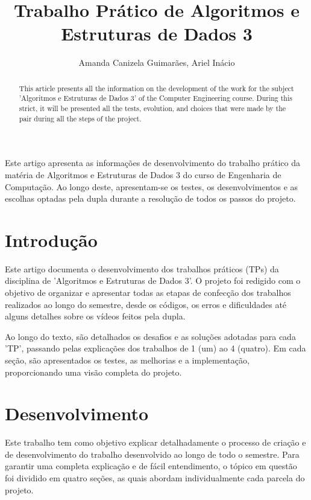 \documentclass[12pt]{article}
\title{Trabalho Prático de Algoritmos e Estruturas de Dados 3}
\author{Amanda Canizela Guimarães\inst{1}, Ariel Inácio\inst{2}
}
\begin{document}
 

\maketitle

\begin{abstract}
  This article presents all the information on the development of the work for the subject 'Algoritmos e Estruturas de Dados 3' of the Computer Engineering course. During this strict, it will be presented all the tests, evolution, and choices that were made by the pair during all the steps of the project.  
\end{abstract}
     
\begin{resumo} 
  Este artigo apresenta as informações de desenvolvimento do trabalho prático da matéria de Algoritmos e Estruturas de Dados 3 do curso de Engenharia de Computação. Ao longo deste, apresentam-se os testes, os desenvolvimentos e as escolhas optadas pela dupla durante a resolução de todos os passos do projeto.
\end{resumo}


\section{Introdução}

Este artigo documenta o desenvolvimento dos trabalhos práticos (TPs) da disciplina de 'Algoritmos e Estruturas de Dados 3'. O projeto foi redigido com o objetivo de organizar e apresentar todas as etapas de confecção dos trabalhos realizados ao longo do semestre, desde os códigos, os erros e dificuldades até alguns detalhes sobre os vídeos feitos pela dupla. 

Ao longo do texto, são detalhados os desafios e as soluções adotadas para cada 'TP', passando pelas explicações dos trabalhos de 1 (um) ao 4 (quatro). Em cada seção, são apresentados os testes, as melhorias e a implementação, proporcionando uma visão completa do projeto.

\section{Desenvolvimento} \label{sec:firstpage}

Este trabalho tem como objetivo explicar detalhadamente o processo de criação e de desenvolvimento do trabalho desenvolvido ao longo de todo o semestre. Para garantir uma completa explicação e de fácil entendimento, o tópico em questão foi dividido em quatro seções, as quais abordam individualmente cada parcela do projeto.
\end{document}
